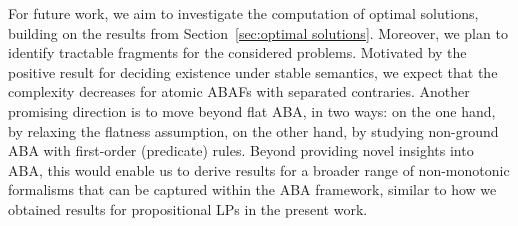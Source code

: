 \documentclass[letterpaper]{article} %
\newif\ifappendix
\begin{document}
For future work, we aim to investigate the computation of optimal solutions, building on the results from Section~\ref{sec:optimal solutions}. Moreover, we plan to identify tractable fragments for the considered problems.
Motivated by the positive result for deciding existence under stable semantics, we expect that the complexity decreases for atomic ABAFs with separated contraries.
Another promising direction is to move beyond flat ABA, in two ways: on the one hand, by relaxing the flatness assumption, on the other hand, by studying non-ground ABA with first-order (predicate) rules. Beyond providing novel insights into ABA, this would enable us to derive results for a broader range of non-monotonic formalisms that can be captured within the ABA framework, similar to how we obtained results for propositional LPs in the present work.








\ifappendix 

\else 
    
\end{document}
